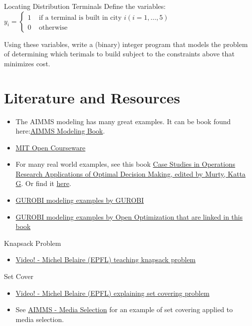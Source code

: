 {\begin{ex}{Locating Distribution Terminals}{}{}
Define the variables:
$y_{i}= \begin{cases}1 & \text { if a terminal is built in city } i(i=1, \ldots, 5) \\ 0 & \text { otherwise }\end{cases}$

Using these variables, write a (binary) integer program that models the problem of determining which terimals to build subject to the constraints above that minimizes cost.
\end{ex}

\section{Literature and Resources}

\begin{resource}



\begin{itemize}
\item The AIMMS modeling has many great examples.  It can be book found here:\href{https://www.aimms.com/english/developers/resources/manuals/optimization-modeling}{AIMMS Modeling Book}.
\item \href{http://web.mit.edu/15.053/www/AMP-Chapter-09.pdf}{MIT Open Courseware}
\item  For many real world examples, see this book \href{https://link-springer-com.ezproxy.lib.vt.edu/book/10.1007/978-1-4939-1007-6}{
Case Studies in Operations Research
Applications of Optimal Decision Making, edited by  Murty, Katta G}.
Or find it \href{https://www.springer.com/gp/book/9781493910069}{here}.
\item \href{https://github.com/Gurobi/modeling-examples}{GUROBI modeling examples by GUROBI}
\item \href{https://github.com/open-optimization/open-optimization-or-examples/tree/master/integer-programming}{GUROBI modeling examples by Open Optimization that are linked in this book}
\end{itemize}

Knapsack Problem
\begin{itemize}
\item \href{https://www.youtube.com/watch?v=GteOoMGUOdY}{Video! - Michel Belaire (EPFL) teaching knapsack problem}
\end{itemize}

Set Cover
\begin{itemize}
\item \href{https://www.youtube.com/watch?v=cjSeHSjPmsk}{Video! - Michel Belaire (EPFL) explaining set covering problem}
\item See \href{https://download.aimms.com/aimms/download/manuals/AIMMS3OM_MediaSelection.pdf}{AIMMS - Media Selection} for an example of set covering applied to media selection.
\end{itemize}


\end{resource}}

